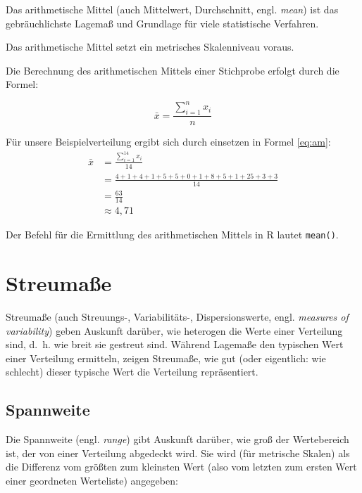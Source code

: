 \documentclass[
  11pt,
  ngerman,
  a4paper,
]{report}
\newenvironment{rtip}{
  \medskip
  \begin{tcolorbox}[colframe=purple,colback=light_gray,title=Softwarehinweis]
}{
  \end{tcolorbox}
  \medskip
}
\begin{document}
Das arithmetische Mittel (auch Mittelwert, Durchschnitt, engl. \emph{mean}) ist das gebräuchlichste Lagemaß und Grundlage für viele statistische Verfahren.

Das arithmetische Mittel setzt ein metrisches Skalenniveau voraus.

Die Berechnung des arithmetischen Mittels einer Stichprobe erfolgt durch die Formel:

\[
 \bar{x}=\frac{\sum\limits _{i=1}^{n}x_{i}}{n}
 \label{eq:am}
\]

Für unsere Beispielverteilung ergibt sich durch einsetzen in Formel \eqref{eq:am}:
\[
  \begin{aligned}
     \bar{x}&=\frac{\sum\limits _{i=1}^{14}x_{i}}{14} \\[4pt]
            &=\frac{4+1+4+1+5+5+0+1+8+5+1+25+3+3}{14} \\[4pt]
            &=\frac{63}{14}\\[4pt]
            &\approx 4{,}71
  \end{aligned}
\]

\begin{rtip}
Der Befehl für die Ermittlung des arithmetischen Mittels in R lautet \verb|mean()|.
\end{rtip}

\hypertarget{streumauxdfe}{%
\section{Streumaße}\label{streumauxdfe}}

Streumaße (auch Streuungs-, Variabilitäts-, Dispersionswerte, engl. \emph{measures of variability}) geben Auskunft darüber, wie heterogen die Werte einer Verteilung sind, d.~h. wie breit sie gestreut sind. Während Lagemaße den typischen Wert einer Verteilung ermitteln, zeigen Streumaße, wie gut (oder eigentlich: wie schlecht) dieser typische Wert die Verteilung repräsentiert.

\hypertarget{spannweite}{%
\subsection{Spannweite}\label{spannweite}}

Die Spannweite (engl. \emph{range}) gibt Auskunft darüber, wie groß der Wertebereich ist, der von einer Verteilung abgedeckt wird. Sie wird (für metrische Skalen) als die Differenz vom größten zum kleinsten Wert (also vom letzten zum ersten Wert einer geordneten Werteliste) angegeben:
\end{document}
